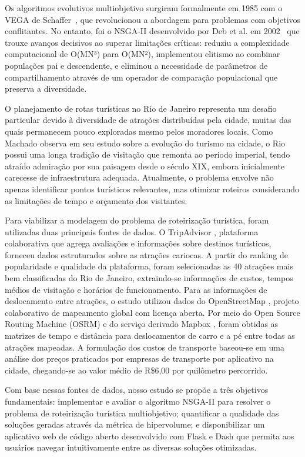 \documentclass{pssbmac}
\begin{document}
Os algoritmos evolutivos multiobjetivo surgiram formalmente em 1985 com o VEGA de Schaffer~\cite{Schaffer1985}, que revolucionou a abordagem para problemas com objetivos conflitantes. No entanto, foi o NSGA-II desenvolvido por Deb et al. em 2002~\cite{Deb2002}  que trouxe avanços decisivos ao superar limitações críticas: reduziu a complexidade computacional de O(MN³) para O(MN²), implementou elitismo ao combinar populações pai e descendente, e eliminou a necessidade de parâmetros de compartilhamento através de um operador de comparação populacional que preserva a diversidade.


O planejamento de rotas turísticas no Rio de Janeiro representa um desafio particular devido à diversidade de atrações distribuídas pela cidade, muitas das quais permanecem pouco exploradas mesmo pelos moradores locais. Como Machado \cite{Machado2013} observa em seu estudo sobre a evolução do turismo na cidade, o Rio possui uma longa tradição de visitação que remonta ao período imperial, tendo atraído admiração por sua paisagem desde o século XIX, embora inicialmente carecesse de infraestrutura adequada. Atualmente, o problema envolve não apenas identificar pontos turísticos relevantes, mas otimizar roteiros considerando as limitações de tempo e orçamento dos visitantes. 

Para viabilizar a modelagem do problema de roteirização turística, foram utilizadas duas principais fontes de dados. O TripAdvisor \cite{TripAdvisor2024}, plataforma colaborativa que agrega avaliações e informações sobre destinos turísticos, forneceu dados estruturados sobre as atrações cariocas. A partir do ranking de popularidade e qualidade da plataforma, foram selecionadas as 40 atrações mais bem classificadas do Rio de Janeiro, extraindo-se informações de custos, tempos médios de visitação e horários de funcionamento. Para as informações de deslocamento entre atrações, o estudo utilizou dados do OpenStreetMap \cite{OpenStreetMap2024}, projeto colaborativo de mapeamento global com licença aberta. Por meio do Open Source Routing Machine (OSRM) e do serviço derivado Mapbox \cite{Mapbox2024}, foram obtidas as matrizes de tempo e distância para deslocamentos de carro e a pé entre todas as atrações mapeadas. A formulação dos custos de transporte baseou-se em uma análise dos preços praticados por empresas de transporte por aplicativo na cidade, chegando-se ao valor médio de R\$6,00 por quilômetro percorrido. 

Com base nessas fontes de dados, nosso estudo se propõe a três objetivos fundamentais: implementar e avaliar o algoritmo NSGA-II para resolver o problema de roteirização turística multiobjetivo; quantificar a qualidade das soluções geradas através da métrica de hipervolume; e disponibilizar um aplicativo web de código aberto desenvolvido com Flask \cite{Flask2024} e Dash \cite{Dash2024} que permita aos usuários navegar intuitivamente entre as diversas soluções otimizadas.
\end{document}
